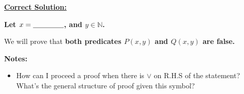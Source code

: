 \documentclass[12pt]{article}
\begin{document}
\begin{enumerate}[a.]
    \begin{mdframed}
        \underline{\textbf{Correct Solution:}}

        \color{red}
        \textbf{Let $x = \underline{\hspace{1.5cm}}$, and $y \in \mathbb{N}$.}

        \bigskip

        We will prove that \color{red}\textbf{both predicates $P(x,y)$ and $Q(x,y)$
        are false.}\color{black}

        \color{black}

    \end{mdframed}


    \textbf{Notes:}
    \begin{itemize}
        \item How can I proceed a proof when there is $\lor$ on R.H.S of the statement?
        What's the general structure of proof given this symbol?
    \end{itemize}
\end{enumerate}
\end{document}
